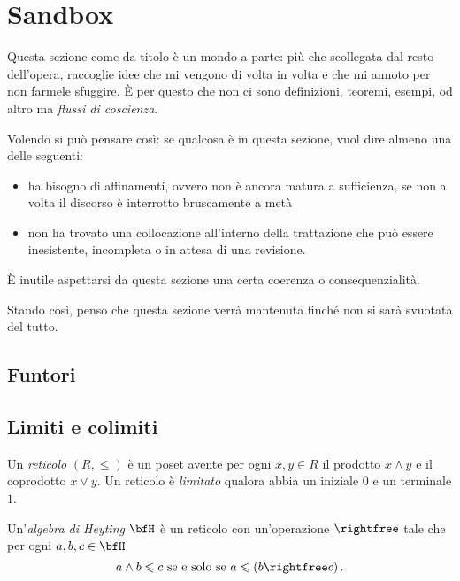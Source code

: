 
\chapter{Sandbox}

Questa sezione come da titolo è un mondo a parte: più che scollegata dal resto dell'opera, raccoglie idee che mi vengono di volta in volta e che mi annoto per non farmele sfuggire. È per questo che non ci sono definizioni, teoremi, esempi, od altro ma {\em flussi di coscienza}.

Volendo si può pensare così: se qualcosa è in questa sezione, vuol dire almeno una delle seguenti:
\begin{itemize}
\item ha bisogno di affinamenti, ovvero non è ancora matura a sufficienza, se non a volta il discorso è interrotto bruscamente a metà
\item non ha trovato una collocazione all'interno della trattazione che può essere inesistente, incompleta o in attesa di una revisione.
\end{itemize}

È inutile aspettarsi da questa sezione una certa coerenza o consequenzialità.

Stando così, penso che questa sezione verrà mantenuta finché non si sarà svuotata del tutto.


\section{Funtori}




\section{Limiti e colimiti}

\begin{flusso}[Reticoli]
Un {\em reticolo} \((R, \leqslant)\) è un poset avente per ogni \(x, y \in R\) il prodotto \(x \land y\) e il coprodotto \(x \lor y\). Un reticolo è {\em limitato} qualora abbia un iniziale \(0\) e un terminale \(1\).
\end{flusso}

\begin{flusso}
Un'{\em algebra di Heyting} \(\bfH\) è un reticolo con un'operazione \(\rightfree\) tale che per ogni \(a, b, c \in \bfH\)
\[a \land b \leqslant c \text{ se e solo se } a \leqslant (b \rightfree c)\,.\]
\end{flusso}
